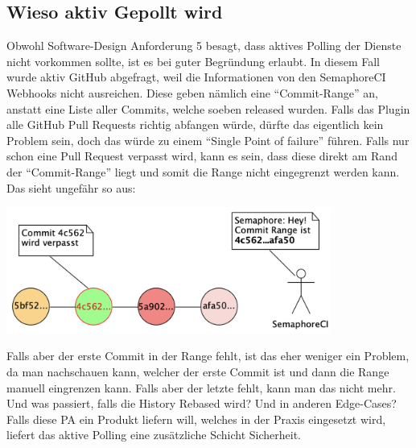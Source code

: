 \subsection{Wieso aktiv Gepollt wird}
\label{sec:why_active_polling}
Obwohl Software-Design Anforderung 5 besagt, dass aktives Polling der Dienste nicht vorkommen sollte, ist
es bei guter Begründung erlaubt. In diesem Fall wurde aktiv GitHub abgefragt, weil die Informationen von
den SemaphoreCI Webhooks nicht ausreichen. Diese geben nämlich eine \enquote{Commit-Range} an, anstatt
eine Liste aller Commits, welche soeben released wurden. \newline
Falls das Plugin alle GitHub Pull Requests richtig abfangen würde, dürfte das eigentlich kein Problem sein,
doch das würde zu einem \enquote{Single Point of failure} führen. Falls nur schon eine Pull Request verpasst
wird, kann es sein, dass diese direkt am Rand der \enquote{Commit-Range} liegt und somit die Range nicht
eingegrenzt werden kann. Das sieht ungefähr so aus:
\begin{center}
  \includegraphics[width=0.8\textwidth]{images/misc/missed_commit_range.png}
  \label{fig:commit_range}
\end{center}
Falls aber der erste Commit in der Range fehlt, ist das eher weniger ein Problem, da man nachschauen
kann, welcher der erste Commit ist und dann die Range manuell eingrenzen kann. \newline
Falls aber der letzte fehlt, kann man das nicht mehr. Und was passiert, falls die History Rebased wird?
Und in anderen Edge-Cases? Falls diese PA ein Produkt liefern will, welches in der Praxis eingesetzt wird,
liefert das aktive Polling eine zusätzliche Schicht Sicherheit.
